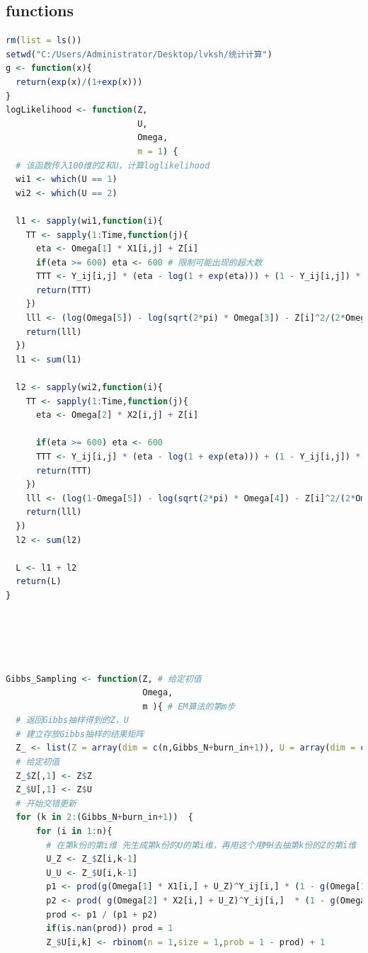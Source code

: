 \documentclass[11pt]{article}
\begin{document}
\subsection{functions}
\begin{lstlisting}[language=R] 
rm(list = ls())
setwd("C:/Users/Administrator/Desktop/lvksh/统计计算")
g <- function(x){
  return(exp(x)/(1+exp(x)))
}
logLikelihood <- function(Z, 
                          U,
                          Omega,
                          m = 1) {
  # 该函数传入100维的Z和U，计算loglikelihood
  wi1 <- which(U == 1)
  wi2 <- which(U == 2)
  
  l1 <- sapply(wi1,function(i){
    TT <- sapply(1:Time,function(j){
      eta <- Omega[1] * X1[i,j] + Z[i]
      if(eta >= 600) eta <- 600 # 限制可能出现的超大数
      TTT <- Y_ij[i,j] * (eta - log(1 + exp(eta))) + (1 - Y_ij[i,j]) * (- log(1 + exp(eta)))
      return(TTT)
    })
    lll <- (log(Omega[5]) - log(sqrt(2*pi) * Omega[3]) - Z[i]^2/(2*Omega[3]^2) + sum(TT))
    return(lll)
  })
  l1 <- sum(l1)
  
  l2 <- sapply(wi2,function(i){
    TT <- sapply(1:Time,function(j){
      eta <- Omega[2] * X2[i,j] + Z[i]
      
      if(eta >= 600) eta <- 600
      TTT <- Y_ij[i,j] * (eta - log(1 + exp(eta))) + (1 - Y_ij[i,j]) * (- log(1 + exp(eta)))
      return(TTT)
    })
    lll <- (log(1-Omega[5]) - log(sqrt(2*pi) * Omega[4]) - Z[i]^2/(2*Omega[4]^2) + sum(TT))
    return(lll)
  })
  l2 <- sum(l2)
  
  L <- l1 + l2
  return(L)
}





Gibbs_Sampling <- function(Z, # 给定初值
                           Omega,
                           m ){ # EM算法的第m步
  # 返回Gibbs抽样得到的Z，U
  # 建立存放Gibbs抽样的结果矩阵
  Z_ <- list(Z = array(dim = c(n,Gibbs_N+burn_in+1)), U = array(dim = c(n,Gibbs_N+burn_in+1)))
  # 给定初值
  Z_$Z[,1] <- Z$Z
  Z_$U[,1] <- Z$U
  # 开始交错更新
  for (k in 2:(Gibbs_N+burn_in+1))  {
      for (i in 1:n){
        # 在第k份的第i维 先生成第k份的U的第i维，再用这个用MH去抽第k份的Z的第i维
        U_Z <- Z_$Z[i,k-1]
        U_U <- Z_$U[i,k-1]
        p1 <- prod(g(Omega[1] * X1[i,] + U_Z)^Y_ij[i,] * (1 - g(Omega[1] * X1[i,] + U_Z))^(1 - Y_ij[i,])) * Omega[5] * dnorm(x = U_Z,mean = 0,sd = Omega[3]) 
        p2 <- prod( g(Omega[2] * X2[i,] + U_Z)^Y_ij[i,]  * (1 - g(Omega[2] * X2[i,] + U_Z))^(1 - Y_ij[i,])) * (1 - Omega[5]) * dnorm(x = U_Z,mean = 0,sd = Omega[4])
        prod <- p1 / (p1 + p2)
        if(is.nan(prod)) prod = 1
        Z_$U[i,k] <- rbinom(n = 1,size = 1,prob = 1 - prod) + 1
        

\end{lstlisting}
\end{document}
